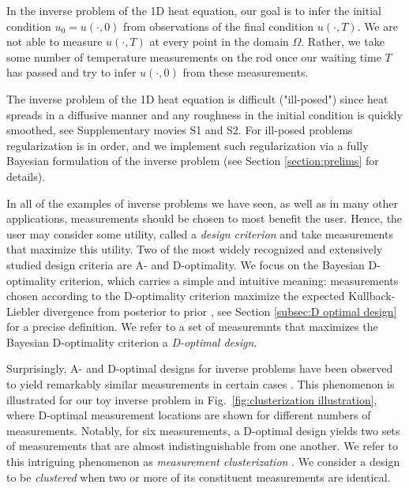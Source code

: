 In the inverse problem of the 1D heat equation, our goal is to infer
the initial condition $u_0 = u(\cdot, 0)$ from observations of the
final condition $u(\cdot, T)$. We are not able to measure $u(\cdot,
T)$ at every point in the domain $\Omega$. Rather, we take some number
of temperature measurements on the rod once our waiting time $T$ has
passed and try to infer $u(\cdot, 0)$ from these measurements.

The inverse problem of the 1D heat equation is difficult ("ill-posed")
since heat spreads in a diffusive manner and any roughness in the
initial condition is quickly smoothed, see Supplementary movies S1 and
S2. For ill-posed problems regularization is in order, and we
implement such regularization via a fully Bayesian formulation of the
inverse problem (see Section \ref{section:prelims} for details).

In all of the examples of inverse problems we have seen, as well as in
many other applications, measurements should be chosen to most benefit
the user. Hence, the user may consider some utility, called a
\emph{design criterion} and take measurements that maximize this
utility. Two of the most widely recognized and extensively studied
design criteria are A- and D-optimality. We focus on the Bayesian
D-optimality criterion, which carries a simple and intuitive meaning:
measurements chosen according to the D-optimality criterion maximize
the expected Kullback-Liebler divergence from posterior to prior
\cite{Chaloner1995, AlexanderianGloorGhattas14}, see Section
\ref{subsec:D optimal design} for a precise definition. We refer to a
set of measuremnts that maximizes the Bayesian D-optimality criterion
a \emph{D-optimal design}.


Surprisingly, A- and D-optimal designs for inverse problems have been
observed to yield remarkably similar measurements in certain cases
\cite{fedorov1996, nyberg2012, fedorov1997, Ucinski05,
  neitzel2019sparse}. This phenomenon is illustrated for our toy
inverse problem in Fig.~\ref{fig:clusterization illustration}, where
D-optimal measurement locations are shown for different numbers of
measurements. Notably, for six measurements, a D-optimal design yields
two sets of measurements that are almost indistinguishable from one
another. We refer to this intriguing phenomenon as \emph{measurement
clusterization} \cite{Ucinski05}. We consider a design to be
\emph{clustered} when two or more of its constituent measurements are
identical.

